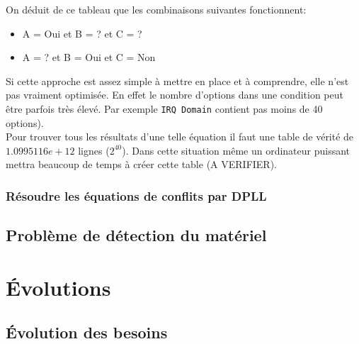 \documentclass[16pts]{report}
\begin{document}
On déduit de ce tableau que les combinaisons suivantes fonctionnent:
\begin{itemize}
    \item A = Oui et B = ?   et C = ?   \\
    \item A = ?   et B = Oui et C = Non \\
\end{itemize}

Si cette approche est assez simple à mettre en place et à comprendre, elle
n'est pas vraiment optimisée. En effet le nombre d'options dans une condition
peut être parfois très élevé. Par exemple \verb|IRQ Domain| contient pas
moins de 40 options).\\
Pour trouver tous les résultats d'une telle équation il faut une table
de vérité de $1.0995116e+12$ lignes ($2^{40}$). Dans cette situation même
un ordinateur puissant mettra beaucoup de temps à créer cette table (A
VERIFIER).


            \subsubsection{Résoudre les équations de conflits par DPLL}
            \label{sub:Résoudre les équations de conflits par DPLL}

        \subsection{Problème de détection du matériel}
        \label{sub:Problème de détection du matériel}

    \section{Évolutions}
    \label{sec:Évolutions}
        \subsection{Évolution des besoins}
        \label{sec:Évolution des besoins}
\end{document}
